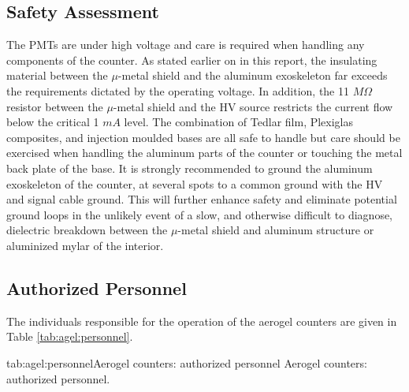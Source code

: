\begin{safetyen}{10}{10}
\section{Safety Assessment}

The PMTs are under high voltage and care is required when handling any 
components of the counter. As stated earlier on in this report, the insulating 
material between the $\mu$-metal shield and the aluminum exoskeleton far 
exceeds the requirements dictated by the operating voltage. 
In addition, the 11 $M\Omega$ resistor between 
the $\mu$-metal shield and the HV source restricts the current flow below the  
critical 1 $mA$ level. The combination of Tedlar film, Plexiglas composites, 
and injection moulded bases are all safe to handle but care should be 
exercised when handling the aluminum parts of the counter or touching the metal 
back plate of the base. It is strongly recommended to ground the aluminum 
exoskeleton of the counter, at several spots to a common ground with the HV 
and signal cable ground. This will further enhance safety and eliminate 
potential ground loops in the unlikely event of a slow, and otherwise difficult 
to diagnose, dielectric breakdown between the $\mu$-metal shield and aluminum 
structure or aluminized mylar of the interior.  

\end{safetyen}

\begin{safetyen}{10}{15}
\section{Authorized Personnel}
\end{safetyen}

The individuals responsible for the operation 
of the aerogel \Cherenkov{} counters are given in Table \ref{tab:agel:personnel}.

\begin{namestab}{tab:agel:personnel}{Aerogel counters: authorized personnel}{%
      Aerogel counters: authorized personnel.}
  \JackSegal{}
\end{namestab}

